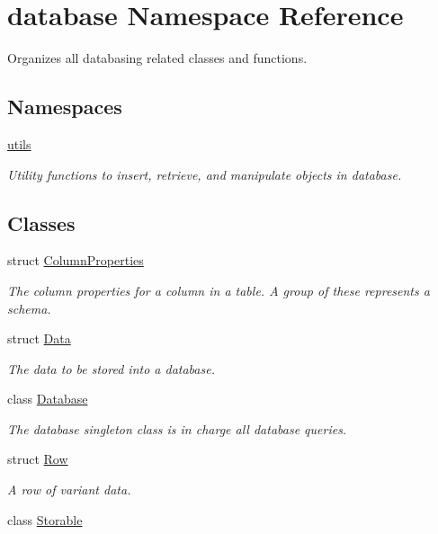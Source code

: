 \hypertarget{namespacedatabase}{}\section{database Namespace Reference}
\label{namespacedatabase}


Organizes all databasing related classes and functions.  


\subsection*{Namespaces}
\begin{DoxyCompactItemize}
\item 
 \hyperlink{namespacedatabase_1_1utils}{utils}
\begin{DoxyCompactList}\small\item\em Utility functions to insert, retrieve, and manipulate objects in database. \end{DoxyCompactList}\end{DoxyCompactItemize}
\subsection*{Classes}
\begin{DoxyCompactItemize}
\item 
struct \hyperlink{structdatabase_1_1_column_properties}{Column\+Properties}
\begin{DoxyCompactList}\small\item\em The column properties for a column in a table. A group of these represents a schema. \end{DoxyCompactList}\item 
struct \hyperlink{structdatabase_1_1_data}{Data}
\begin{DoxyCompactList}\small\item\em The data to be stored into a database. \end{DoxyCompactList}\item 
class \hyperlink{classdatabase_1_1_database}{Database}
\begin{DoxyCompactList}\small\item\em The database singleton class is in charge all database queries. \end{DoxyCompactList}\item 
struct \hyperlink{structdatabase_1_1_row}{Row}
\begin{DoxyCompactList}\small\item\em A row of variant data. \end{DoxyCompactList}\item 
class \hyperlink{classdatabase_1_1_storable}{Storable}
\end{DoxyCompactItemize}
